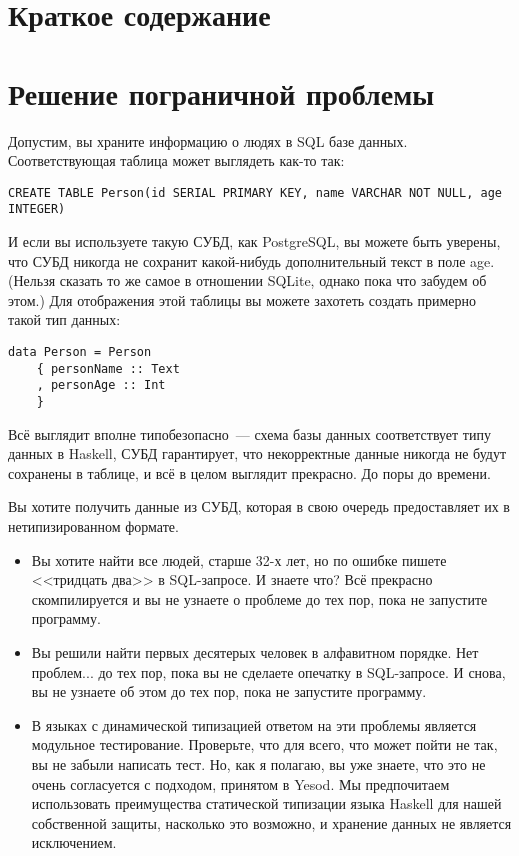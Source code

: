 \section{Краткое содержание}


\section{Решение пограничной проблемы}

Допустим, вы храните информацию о людях в SQL базе данных. Соответствующая таблица может выглядеть как-то так:

\begin{lstlisting}
CREATE TABLE Person(id SERIAL PRIMARY KEY, name VARCHAR NOT NULL, age INTEGER)
\end{lstlisting}

И если вы используете такую СУБД, как PostgreSQL, вы можете быть уверены, что СУБД никогда не сохранит какой-нибудь дополнительный текст в поле age. (Нельзя сказать то же самое в отношении SQLite, однако пока что забудем об этом.) Для отображения этой таблицы вы можете захотеть создать примерно такой тип данных:

\begin{lstlisting}
data Person = Person
    { personName :: Text
    , personAge :: Int
    }
\end{lstlisting}

Всё выглядит вполне типобезопасно~--- схема базы данных соответствует типу данных в Haskell, СУБД гарантирует, что некорректные данные никогда не будут сохранены в таблице, и всё в целом выглядит прекрасно. До поры до времени.

Вы хотите получить данные из СУБД, которая в свою очередь предоставляет их в нетипизированном формате.

\begin{itemize}
  \item Вы хотите найти все людей, старше 32-х лет, но по ошибке пишете <<тридцать два>> в SQL-запросе. И знаете что? Всё прекрасно скомпилируется и вы не узнаете о проблеме до тех пор, пока не запустите программу.
  \item Вы решили найти первых десятерых человек в алфавитном порядке. Нет проблем... до тех пор, пока вы не сделаете опечатку в SQL-запросе. И снова, вы не узнаете об этом до тех пор, пока не запустите программу.
  \item В языках с динамической типизацией ответом на эти проблемы является модульное тестирование. Проверьте, что для всего, что может пойти не так, вы не забыли написать тест. Но, как я полагаю, вы уже знаете, что это не очень согласуется с подходом, принятом в Yesod. Мы предпочитаем использовать преимущества статической типизации языка Haskell для нашей собственной защиты, насколько это возможно, и хранение данных не является исключением.
\end{itemize}

